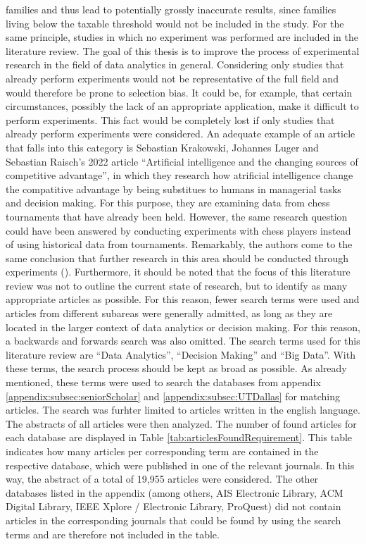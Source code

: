 families and thus lead to potentially grossly inaccurate results, since families living below the taxable threshold would not be included in the study. For the same principle, studies in which no experiment was performed are included in the literature review. The goal of this thesis is to improve the process of experimental research in the field of data analytics in general. Considering only studies that already perform experiments would not be representative of the full field and would therefore be prone to selection bias. It could be, for example, that certain circumstances, possibly the lack of an appropriate application, make it difficult to perform experiments. This fact would be completely lost if only studies that already perform experiments were considered. An adequate example of an article that falls into this category is Sebastian Krakowski, Johannes Luger and Sebastian Raisch's 2022 article \enquote{Artificial intelligence and the changing sources of competitive advantage}, in which they research how atrificial intelligence change the compatitive advantage by being substitues to humans in managerial tasks and decision making. For this purpose, they are examining data from chess tournaments that have already been held. However, the same research question could have been answered by conducting experiments with chess players instead of using historical data from tournaments. Remarkably, the authors come to the same conclusion that further research in this area should be conducted through experiments (\cite{Krakowski.2022}). Furthermore, it should be noted that the focus of this literature review was not to outline the current state of research, but to identify as many appropriate articles as possible. For this reason, fewer search terms were used and articles from different subareas were generally admitted, as long as they are located in the larger context of data analytics or decision making. For this reason, a backwards and forwards search was also omitted.
The search terms used for this literature review are \enquote{Data Analytics}, \enquote{Decision Making} and \enquote{Big Data}. With these terms, the search process should be kept as broad as possible. As already mentioned, these terms were used to search the databases from appendix \ref{appendix:subsec:seniorScholar} and \ref{appendix:subsec:UTDallas} for matching articles. The search was furhter limited to articles written in the english language. The abstracts of all articles were then analyzed. The number of found articles for each database are displayed in Table \ref{tab:articlesFoundRequirement}. This table indicates how many articles per corresponding term are contained in the respective database, which were published in one of the relevant journals. In this way, the abstract of a total of 19,955 articles were considered. The other databases listed in the appendix (among others, AIS Electronic Library, ACM Digital Library, IEEE Xplore / Electronic Library, ProQuest) did not contain articles in the corresponding journals that could be found by using the search terms and are therefore not included in the table.

